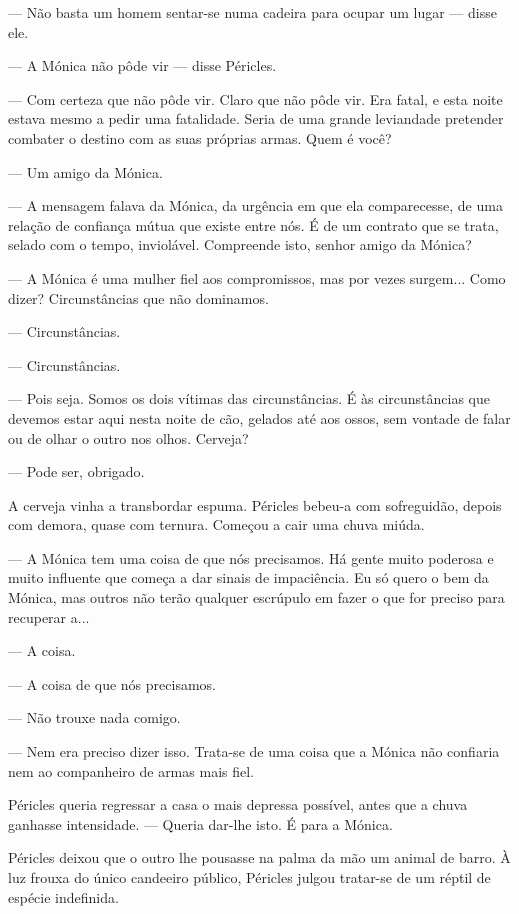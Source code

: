 --- Não basta um homem sentar-se numa cadeira para ocupar um lugar ---
  disse ele.

--- A Mónica não pôde vir --- disse Péricles.

--- Com certeza que não pôde vir. Claro que não pôde vir. Era fatal, e
  esta noite estava mesmo a pedir uma fatalidade.
Seria de uma grande leviandade pretender combater o destino com as suas
próprias armas. Quem é você?

--- Um amigo da Mónica.

--- A mensagem falava da Mónica, da urgência em que ela comparecesse, de
  uma relação de confiança mútua que existe entre nós. É de um contrato
  que se trata, selado com o tempo, inviolável. Compreende isto, senhor
  amigo da Mónica?

--- A Mónica é uma mulher fiel aos compromissos, mas por vezes surgem...
  Como dizer? Circunstâncias que não dominamos.

--- Circunstâncias.

--- Circunstâncias.

--- Pois seja. Somos os dois vítimas das circunstâncias. É às
  circunstâncias que devemos estar aqui nesta noite de cão, gelados até
  aos ossos, sem vontade de falar ou de olhar o outro nos olhos.
  Cerveja?

--- Pode ser, obrigado.

A cerveja vinha a transbordar espuma. Péricles bebeu-a com sofreguidão,
depois com demora, quase com ternura. Começou a cair uma chuva miúda.

--- A Mónica tem uma coisa de que nós precisamos. Há gente muito poderosa
  e muito influente que começa a dar sinais de impaciência. Eu só
  quero o bem da Mónica, mas outros não terão qualquer escrúpulo em
  fazer o que for preciso para recuperar a...

--- A coisa.

--- A coisa de que nós precisamos.

--- Não trouxe nada comigo.

--- Nem era preciso dizer isso. Trata-se de uma coisa que a Mónica não
  confiaria nem ao companheiro de armas mais fiel.

  Péricles queria
  regressar a casa o mais depressa possível, antes que a chuva ganhasse intensidade. --- Queria dar-lhe isto. É para
a Mónica.

Péricles deixou que o outro lhe pousasse na palma da mão um animal de
barro. À luz frouxa do único candeeiro público, Péricles julgou
tratar-se de um réptil de espécie indefinida.

